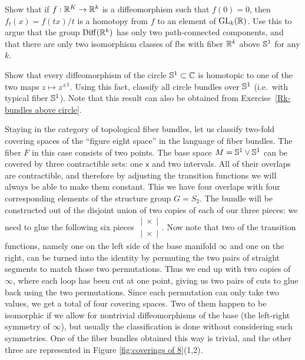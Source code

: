 \begin{xca}\label{Rk-bundles above circle}
    Show that if $f:\mathbb{R}^K\to \mathbb{R}^k$ is a diffeomorphism such that $f(0)=0$, then $f_t(x)=f(tx)/t$ is a homotopy from $f$ to an element of $\operatorname{GL}_k(\mathbb{R})$. Use this to argue that the group $\operatorname{Diff}(\mathbb{R}^k)$ has only two path-connected components, and that there are only two isomorphism classes of \glspl{fb} with fiber $\mathbb{R}^k$  above $\mathbb{S}^1$ for any $k$.
\end{xca}
\begin{xca}
    Show that every diffeomorphism of the circle $\mathbb{S}^1\subset \mathbb{C}$ is homotopic to one of the two maps $z\mapsto z^{\pm 1}$. Using this fact, classify all circle bundles over $\mathbb{S}^1$ (i.e.~with typical fiber $\mathbb{S}^1$). Note that this result can also be obtained from Exercise~\ref{Rk-bundles above circle}.
\end{xca}

\begin{example}
    Staying in the category of topological fiber bundles, let us classify two-fold covering spaces of the ``figure eight space'' in the language of fiber bundles. The fiber $F$ in this case consists of two points. The base space $M=\mathbb{S}^1\vee \mathbb{S}^1$ can be covered by three contractible sets: one $\mathsf{x}$ and two intervals. All of their overlaps are contractible, and therefore by adjusting the transition functions we will always be able to make them constant. This we have four overlaps with four corresponding elements of the structure group $G=S_2$. The bundle will be constructed out of the disjoint union of two copies of each of our three pieces: we need to glue the following six pieces $\begin{matrix}
        |\; \times \;|\\
        |\; \times \;|
    \end{matrix}$. Now note that two of the transition functions, namely one on the left side of the base manifold $\infty$ and one on the right, can be turned into the identity by permuting the two pairs of straight segments to match those two permutations. Thus we end up with two copies of $\infty$, where each loop has been cut at one point, giving us two pairs of cuts to glue back using the two permutations. Since each permutation can only take two values, we get a total of four covering spaces. Two of them happen to be isomorphic if we allow for nontrivial diffeomorphisms of the base (the left-right symmetry of $\infty$), but usually the classification is done without considering such symmetries. One of the fiber bundles obtained this way is trivial, and the other three are represented in Figure \ref{fig:coverings of 8}(1,2).
\end{example}

